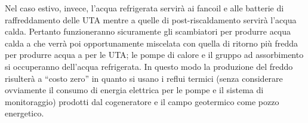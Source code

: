 Nel caso estivo, invece, l'acqua refrigerata servirà ai fancoil e alle batterie di raffreddamento delle UTA mentre a quelle di post-riscaldamento servirà l'acqua calda. Pertanto funzioneranno sicuramente gli scambiatori per produrre acqua calda a  che verrà poi opportunamente miscelata con quella di ritorno più fredda per produrre acqua a  per le UTA; le pompe di calore e il gruppo ad assorbimento si occuperanno dell'acqua refrigerata. In questo modo la produzione del freddo risulterà a ``costo zero'' in quanto si usano i reflui termici (senza considerare ovviamente il consumo di energia elettrica per le pompe e il sistema di monitoraggio) prodotti dal cogeneratore e il campo geotermico come pozzo energetico.


